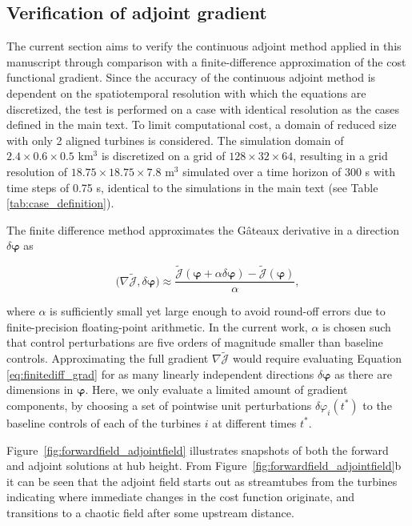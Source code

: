 \documentclass[energies,article,submit,moreauthors,latex,10pt,a4paper]{mdpi}
\newcommand{\bs}[1]{\boldsymbol{#1}}
\newcommand{\Jtilde}{\tilde{\mathscr{J}}}
\newcommand{\innerproduct}[2]{\bigg( #1, #2 \bigg)}
\begin{document}
\subsection{Verification of adjoint gradient}\label{sec:app_adj_verif}
\noindent The current section aims to verify the continuous adjoint method applied in this manuscript through comparison with a finite-difference approximation of the cost functional gradient. Since the accuracy of the continuous adjoint method is dependent on the spatiotemporal resolution with which the equations are discretized, the test is performed on a case with identical resolution as the cases defined in the main text. To limit computational cost, a domain of reduced size with only 2 aligned turbines is considered. The simulation domain of $2.4 \times 0.6 \times 0.5$ km$^3$ is discretized on a grid of $128 \times 32 \times 64$, resulting in a grid resolution of $18.75 \times 18.75 \times 7.8$ m$^3$ simulated over a time horizon of 300 s with time steps of 0.75 s, identical to the simulations in the main text (see Table \ref{tab:case_definition}).

The finite difference method approximates the G\^ateaux derivative in a direction $\delta \bs{\varphi}$ as

\begin{equation}\label{eq:finitediff_grad}
\innerproduct{\nabla \Jtilde}{\delta \bs{\varphi}} \approx \frac{\Jtilde(\bs{\varphi} + \alpha \delta \bs{\varphi}) - \Jtilde(\bs{\varphi})}{\alpha},
\end{equation}

\noindent where $\alpha$ is sufficiently small yet large enough to avoid round-off errors due to finite-precision floating-point arithmetic. In the current work, $\alpha$ is chosen such that control perturbations are five orders of magnitude smaller than baseline controls. Approximating the full gradient $\nabla \Jtilde$ would require evaluating Equation \eqref{eq:finitediff_grad} for as many linearly independent directions $\delta \bs{\varphi}$ as there are dimensions in $\bs{\varphi}$. Here, we only evaluate a limited amount of gradient components, by choosing a set of pointwise unit perturbations $\delta \varphi_i(t^*)$ to the baseline controls of each of the turbines $i$ at different times $t^*$. 

Figure~\ref{fig:forwardfield_adjointfield} illustrates snapshots of both the forward and adjoint solutions at hub height. From Figure~\ref{fig:forwardfield_adjointfield}b it can be seen that the adjoint field starts out as streamtubes from the turbines indicating where immediate changes in the cost function originate, and transitions to a chaotic field after some upstream distance. 
\end{document}
